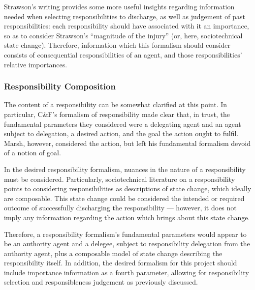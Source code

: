 Strawson's writing provides some more useful insights regarding information needed when selecting responsibilities to discharge, as well as judgement of past responsibilities: each responsibility should have associated with it an importance, so as to consider Strawson's ``magnitude of the injury'' (or, here, sociotechnical state change). Therefore, information which this formalism should consider consists of consequential responsibilities of an agent, and those responsibilities' relative importances.\par

\subsubsection{Responsibility Composition}
The content of a responsibility can be somewhat clarified at this point. In particular, C\&F's formalism of responsibility made clear that, in trust, the fundamental parameters they considered were a delegating agent and an agent subject to delegation, a desired action, and the goal the action ought to fulfil. Marsh, however, considered the action, but left his fundamental formalism devoid of a notion of goal.\par

In the desired responsibility formalism, nuances in the nature of a responsibility must be considered. Particularly, sociotechnical literature on a responsibility points to considering responsibilities as descriptions of state change, which ideally are composable. This state change could be considered the intended or required outcome of successfully discharging the responsibility --- however, it does not imply any information regarding the action which brings about this state change.\par

Therefore, a responsibility formalism's fundamental parameters would appear to be an authority agent and a delegee, subject to responsibility delegation from the authority agent, plus a composable model of state change describing the responsibility itself. In addition, the desired formalism for this project should include importance information as a fourth parameter, allowing for responsibility selection and responsibleness judgement as previously discussed.\par

